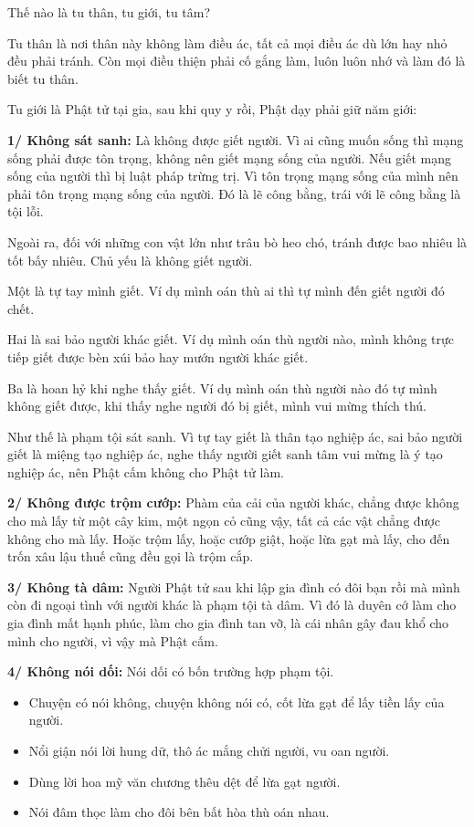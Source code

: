 \documentclass[
  12pt,
  oneside]{book}
\providecommand{\tightlist}{%
  \setlength{\itemsep}{0pt}\setlength{\parskip}{0pt}}
\begin{document}
Thế nào là tu thân, tu giới, tu tâm?

Tu thân là nơi thân này không làm điều ác, tất cả mọi điều ác dù lớn hay nhỏ đều phải tránh. Còn mọi điều thiện phải cố gắng làm, luôn luôn nhớ và làm đó là biết tu thân.

Tu giới là Phật tử tại gia, sau khi quy y rồi, Phật dạy phải giữ năm giới:

\textbf{1/ Không sát sanh:} Là không được giết người. Vì ai cũng muốn sống thì mạng sống phải được tôn trọng, không nên giết mạng sống của người. Nếu giết mạng sống của người thì bị luật pháp trừng trị. Vì tôn trọng mạng sống của mình nên phải tôn trọng mạng sống của người. Đó là lẽ công bằng, trái với lẽ công bằng là tội lỗi.

Ngoài ra, đối với những con vật lớn như trâu bò heo chó, tránh được bao nhiêu là tốt bấy nhiêu. Chủ yếu là không giết người.

Một là tự tay mình giết. Ví dụ mình oán thù ai thì tự mình đến giết người đó chết.

Hai là sai bảo người khác giết. Ví dụ mình oán thù người nào, mình không trực tiếp giết được bèn xúi bảo hay mướn người khác giết.

Ba là hoan hỷ khi nghe thấy giết. Ví dụ mình oán thù người nào đó tự mình không giết được, khi thấy nghe người đó bị giết, mình vui mừng thích thú.

Như thế là phạm tội sát sanh. Vì tự tay giết là thân tạo nghiệp ác, sai bảo người giết là miệng tạo nghiệp ác, nghe thấy người giết sanh tâm vui mừng là ý tạo nghiệp ác, nên Phật cấm không cho Phật tử làm.

\textbf{2/ Không được trộm cướp:} Phàm của cải của người khác, chẳng được không cho mà lấy từ một cây kim, một ngọn cỏ cũng vậy, tất cả các vật chẳng được không cho mà lấy. Hoặc trộm lấy, hoặc cướp giật, hoặc lừa gạt mà lấy, cho đến trốn xâu lậu thuế cũng đều gọi là trộm cắp.

\textbf{3/ Không tà dâm:} Người Phật tử sau khi lập gia đình có đôi bạn rồi mà mình còn đi ngoại tình với người khác là phạm tội tà dâm. Vì đó là duyên cớ làm cho gia đình mất hạnh phúc, làm cho gia đình tan vỡ, là cái nhân gây đau khổ cho mình cho người, vì vậy mà Phật cấm.

\textbf{4/ Không nói dối:} Nói dối có bốn trường hợp phạm tội.

\begin{itemize}
\tightlist
\item
  Chuyện có nói không, chuyện không nói có, cốt lừa gạt để lấy tiền lấy của người.\\
\item
  Nổi giận nói lời hung dữ, thô ác mắng chửi người, vu oan người.\\
\item
  Dùng lời hoa mỹ văn chương thêu dệt để lừa gạt người.\\
\item
  Nói đâm thọc làm cho đôi bên bất hòa thù oán nhau.
\end{itemize}
\end{document}
